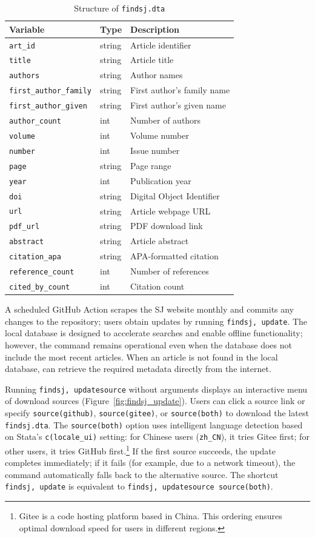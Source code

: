 \begin{table}[htbp]
\centering
\caption{Structure of {\tt findsj.dta}}
\label{tab:database_structure}
\begin{tabular}{lll}
\hline
Variable & Type & Description \\
\hline
{\tt art\_id} & string & Article identifier \\
{\tt title} & string & Article title \\
{\tt authors} & string & Author names \\
{\tt first\_author\_family} & string & First author's family name \\
{\tt first\_author\_given} & string & First author's given name \\
{\tt author\_count} & int & Number of authors \\
{\tt volume} & int & Volume number \\
{\tt number} & int & Issue number \\
{\tt page} & string & Page range \\
{\tt year} & int & Publication year \\
{\tt doi} & string & Digital Object Identifier \\
{\tt url} & string & Article webpage URL \\
{\tt pdf\_url} & string & PDF download link \\
{\tt abstract} & string & Article abstract \\
{\tt citation\_apa} & string & APA-formatted citation \\
{\tt reference\_count} & int & Number of references \\
{\tt cited\_by\_count} & int & Citation count \\
\hline
\end{tabular}
\end{table}

A scheduled GitHub Action scrapes the SJ website monthly and commits any changes to the repository; users obtain updates by running {\tt findsj, update}. The local database is designed to accelerate searches and enable offline functionality; however, the command remains operational even when the database does not include the most recent articles. When an article is not found in the local database,  can retrieve the required metadata directly from the internet.

Running {\tt findsj, updatesource} without arguments displays an interactive menu of download sources (Figure~\ref{fig:findsj_update}). Users can click a source link or specify {\tt source(github)}, {\tt source(gitee)}, or {\tt source(both)} to download the latest {\tt findsj.dta}. The {\tt source(both)} option uses intelligent language detection based on Stata's {\tt c(locale\_ui)} setting: for Chinese users ({\tt zh\_CN}), it tries Gitee first; for other users, it tries GitHub first.\footnote{Gitee is a code hosting platform based in China. This ordering ensures optimal download speed for users in different regions.} If the first source succeeds, the update completes immediately; if it fails (for example, due to a network timeout), the command automatically falls back to the alternative source. The shortcut {\tt findsj, update} is equivalent to {\tt findsj, updatesource source(both)}.

